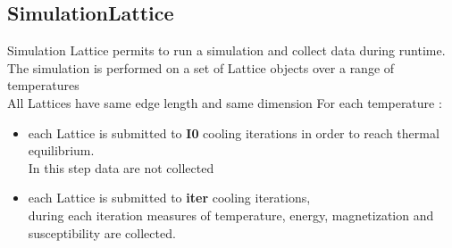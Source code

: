 \newpage


\subsection*{SimulationLattice}

Simulation Lattice permits to run a simulation and collect data during runtime.
The simulation is performed on a set of Lattice objects over a range of temperatures \\
All Lattices have same edge length and same dimension
For each temperature :  
\begin{itemize}
	\item[] each Lattice is submitted to \textbf{I0} cooling iterations in order to reach thermal equilibrium. \\ In this step data are not collected
	\item[] each Lattice is submitted to \textbf{iter} cooling iterations,   \\
	 		during each iteration measures of temperature, energy, magnetization and susceptibility are 				collected. 
\end{itemize} 
 
